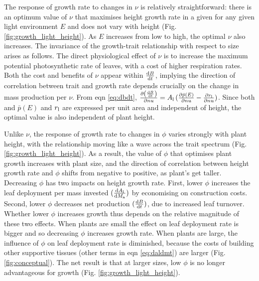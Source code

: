\documentclass[a4paper,11pt]{article}
\begin{document}
 The response of growth rate to changes in $\nu$ is relatively straightforward: there is an optimum value of $\nu$ that maximises height growth rate in a given for any given light environment $E$ and does not vary with height (Fig. \ref{fig:growth_light_height}). As $E$ increases from low to high, the optimal $\nu$ also increases. The invariance of the growth-trait relationship with respect to size arises as follows. The direct physiological effect of $\nu$ is to increase the maximum potential photosynthetic rate of leaves, with a cost of higher respiration rates. Both the cost and benefits of $\nu$ appear within $\frac{ {\rm d}B} {{\rm d}t}$, implying the direction of correlation between trait and growth rate depends crucially on the change in mass production per $\nu$.
From eqn \ref{eq:dbdt}, $\frac{\partial \left( \frac{ {\rm d}B} {{\rm d}t}\right)}{\partial nu} = A_{\rm l} \, (\frac{ \partial \bar{p}(E)}{\partial nu}  - \frac{ \partial r_{\rm l}}{\partial nu} )$. Since both and $\bar{p}(E)$ and $r_{\rm l}$ are expressed per unit area and independent of height, the optimal value is also independent of plant height.

Unlike $\nu$, the response of growth rate to changes in $\phi$ varies strongly with plant height, with the relationship moving like a wave across the trait spectrum (Fig. \ref{fig:growth_light_height}). As a result, the value of $\phi$ that optimises plant growth increases with plant size, and the direction of correlation between height growth rate and $\phi$ shifts from negative to positive, as plant's get taller. Decreasing $\phi$ has two impacts on height growth rate. First, lower $\phi$ increases the leaf deployment per mass invested $(\frac{{\rm d}A_{\rm l}}{{\rm d}M_{\rm a}})$ by economising on construction costs. Second, lower $\phi$ decreases net production $(\frac{{\rm d}B}{{\rm d}t})$, due to increased leaf turnover. Whether lower $\phi$ increases growth thus depends on the relative magnitude of these two effects. When plants are small the effect on leaf deployment rate is bigger and so decreasing $\phi$ increases growth rate. When plants are large, the influence of $\phi$ on leaf deployment rate is diminished, because the costs of building other supportive tissues (other terms in eqn \ref{eq:daldmt}) are larger (Fig. \ref{fig:conceptual}). The net result is that at larger sizes, low $\phi$ is no longer advantageous for growth (Fig. \ref{fig:growth_light_height}).
\end{document}
